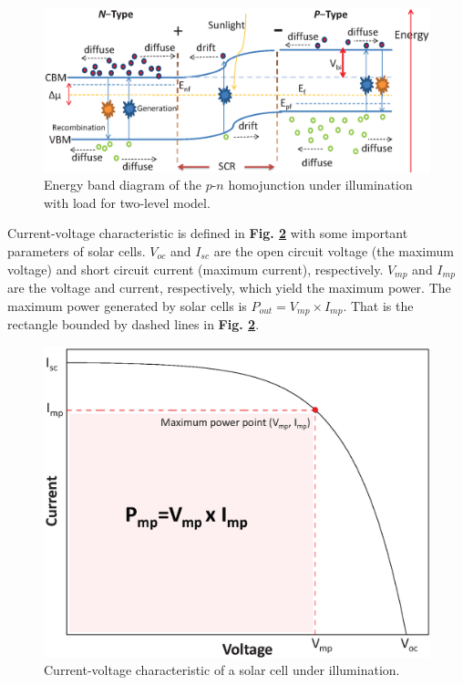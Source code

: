 \documentclass[a4paper, 12pt, titlepage,oneside,drop]{kthesis}
\begin{document}
\begin{figure}[H]
\centering
\includegraphics[scale=0.5]{illumination1.eps}
\caption{Energy band diagram of the $p$-$n$ homojunction under illumination with load for two-level model.}
\label{illu1}
\end{figure}


Current-voltage characteristic is defined in \textbf{Fig. \ref{ivcharac}} with some important parameters of solar cells. $V_{oc}$ and $I_{sc}$ are the open circuit voltage (the maximum voltage) and short circuit current
(maximum current), respectively. $V_{mp}$ and $I_{mp}$ are the voltage and current, respectively,  which yield the maximum power. The maximum power generated by solar cells
is $P_{out}=V_{mp} \times I_{mp}$. That is the rectangle bounded by dashed lines in \textbf{Fig. \ref{ivcharac}}. 

\begin{figure}[H]
\centering
\includegraphics[scale=0.5]{IV.eps}
\caption{Current-voltage characteristic of a solar cell under illumination.}
\label{ivcharac}
\end{figure}
\end{document}
